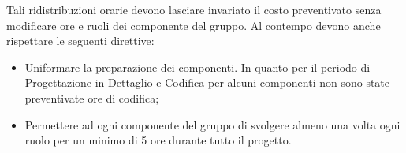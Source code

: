 Tali ridistribuzioni orarie devono lasciare invariato il costo preventivato senza modificare 
ore e ruoli dei componente del gruppo. Al contempo devono anche rispettare le seguenti direttive:
\begin{itemize}
	\item Uniformare la preparazione dei componenti. In quanto per il periodo di Progettazione in Dettaglio e Codifica per alcuni componenti non sono state preventivate ore di codifica;
	\item Permettere ad ogni componente del gruppo di svolgere almeno una volta ogni ruolo per un minimo di 5 ore durante tutto il progetto. 	
\end{itemize}
